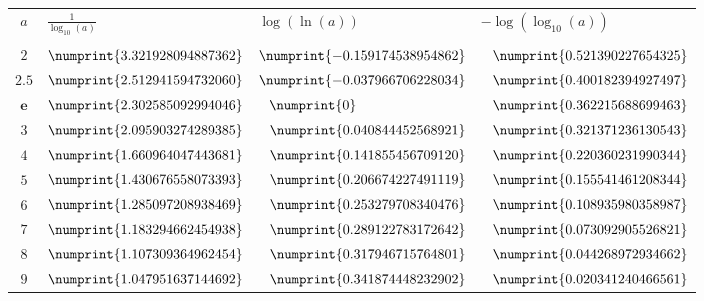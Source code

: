 \documentclass[a4paper]{article}
\begin{document}
\vspace{0.2cm}

\begin{center}
\begin{large}
\begin{tabular}{c||l||l|l}

\Large $a$ & \LARGE \hfil $ \frac{1}{\log_{10}(a)} $ \hfill & \Large \hfil $\log(\ln(a))$ \hfill & \Large \hfil  $- \log(\log_{10}(a))$ \hfill \\

&&&\\

$2$ & $\numprint{3.321928094887362}$ & $ \numprint{-0.159174538954862}$ & $ \phantom{-}\numprint{0.521390227654325} $\\

$2.5$ & $\numprint{2.512941594732060}$ & $ \numprint{-0.037966706228034}$ & $ \phantom{-}\numprint{0.400182394927497} $\\

$\mathbf{e}$ & $\numprint{2.302585092994046}$ & $ \phantom{-}\numprint{0}$ & $ \phantom{-}\numprint{0.362215688699463} $\\

$3$ & $\numprint{2.095903274289385}$ & $ \phantom{-}\numprint{0.040844452568921}$ & $ \phantom{-}\numprint{0.321371236130543} $\\

$4$ & $\numprint{1.660964047443681}$ & $ \phantom{-}\numprint{0.141855456709120}$ & $ \phantom{-}\numprint{0.220360231990344} $\\

$5$ & $\numprint{1.430676558073393}$ & $ \phantom{-}\numprint{0.206674227491119}$ & $ \phantom{-}\numprint{0.155541461208344} $\\

$6$ & $\numprint{1.285097208938469}$ & $ \phantom{-}\numprint{0.253279708340476}$ & $ \phantom{-}\numprint{0.108935980358987} $\\

$7$ & $\numprint{1.183294662454938}$ & $ \phantom{-}\numprint{0.289122783172642}$ & $ \phantom{-}\numprint{0.073092905526821} $\\

$8$ & $\numprint{1.107309364962454}$ & $ \phantom{-}\numprint{0.317946715764801}$ & $ \phantom{-}\numprint{0.044268972934662} $\\

$9$ & $\numprint{1.047951637144692}$ & $ \phantom{-}\numprint{0.341874448232902}$ & $ \phantom{-}\numprint{0.020341240466561} $\\


\end{tabular}
\end{large}
\end{center}
\end{document}
